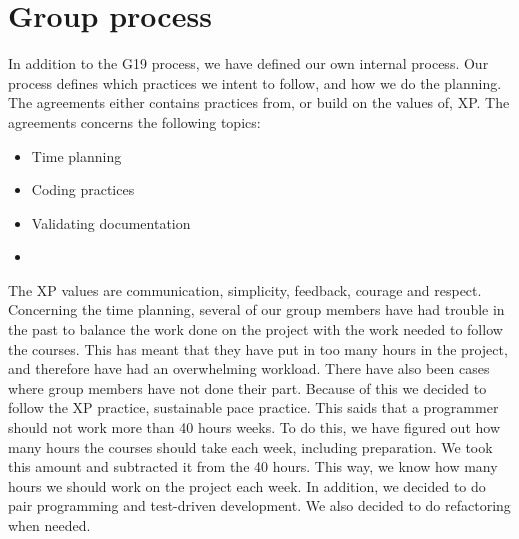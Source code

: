 \section{Group process}

In addition to the \gls{G19} process, we have defined our own internal process. 
Our process defines which practices we intent to follow, and how we do the planning. 
The agreements either contains practices from, or build on the values of, \gls{XP}.
The agreements concerns the following topics: 
\begin{itemize}
    \item Time planning 
    \item Coding practices
    \item Validating documentation
    \item 
\end{itemize}

The XP values are communication, simplicity, feedback, courage and respect. 
Concerning the time planning, several of our group members have had trouble in the past to balance the work done on the project with the work needed to follow the courses. This has meant that they have put in too many hours in the project, and therefore have had an overwhelming workload. There have also been cases where group members have not done their part. 
Because of this we decided to follow the \gls{XP} practice, sustainable pace practice. This saids that a programmer should not work more than 40 hours weeks. To do this, we have figured out how many hours the courses should take each week, including preparation. We took this amount and subtracted it from the 40 hours. This way, we know how many hours we should work on the project each week. 
In addition, we decided to do pair programming and test-driven development. 
We also decided to do refactoring when needed. 